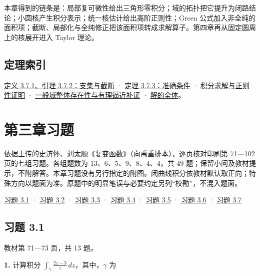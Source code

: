 \documentclass[11pt,a4paper]{article}
\begin{document}
本章得到的链条是：局部复可微性给出三角形零积分；域的拓扑把它提升为闭路结论；小圆核产生积分表示；统一核估计给出高阶正则性；Green
公式加入非全纯的面积项；截断、局部化与全纯修正把该面积项转成求解算子。第四章再从固定圆周上的核展开进入
Taylor 理论。

\subsection{定理索引}\label{ch03-s7-ux5b9aux7406ux7d22ux5f15}

\hyperref[ch03-s7-ux652fux96c6ux4e0eux5149ux6ed1ux622aux65ad]{定义 3.7.1、引理
3.7.2：支集与截断} ·
\hyperref[ch03-s7-ux5b9aux7406-373-ux7684ux6761ux4ef6ux6821ux52d8]{定理
3.7.3：准确条件} ·
\hyperref[ch03-s7-ux5c40ux90e8ux5316ux4e0eux6c42ux5bfcux7684ux5b8cux6574ux8bc1ux660e]{积分求解与正则性证明}
·
\hyperref[ch03-s7-ux4efbux610fux57dfux4e0aux7684ux6574ux4f53ux5b58ux5728ux6027ux8865ux8bc1]{一般域整体存在性与有理逼近补证}
·
\hyperref[ch03-s7-ux89e3ux7684ux4e0dux552fux4e00ux6027ux4e0eux672cux7ae0ux8fdeux63a5]{解的全体}。

\clearpage\section*{第三章习题}
依据上传的史济怀、刘太顺《复变函数》（向禹重排本），逐页核对印刷第
71---102 页的七组习题。各组题数为 13、6、5、9、8、4、4，共 49
题；保留小问及教材提示，不附解答。本章习题没有另行指定的附图。闭曲线积分依教材默认取正向；特殊方向以题面为准。原题中的明显笔误与必要约定另列``校勘''，不混入题面。

\hyperref[ch03-practice-ux4e60ux9898-31]{习题 3.1} · \hyperref[ch03-practice-ux4e60ux9898-32]{习题
3.2} · \hyperref[ch03-practice-ux4e60ux9898-33]{习题 3.3} ·
\hyperref[ch03-practice-ux4e60ux9898-34]{习题 3.4} · \hyperref[ch03-practice-ux4e60ux9898-35]{习题
3.5} · \hyperref[ch03-practice-ux4e60ux9898-36]{习题 3.6} ·
\hyperref[ch03-practice-ux4e60ux9898-37]{习题 3.7}

\subsection{习题 3.1}\label{ch03-practice-ux4e60ux9898-31}

教材第 71---73 页，共 13 题。

\par{}
\noindent\textbf{1.} 计算积分 \(\int_\gamma\frac{2z-3}{z}\,dz\)，其中，\(\gamma\)
为
\end{document}
